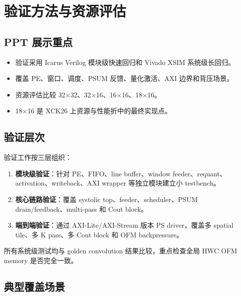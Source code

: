 \documentclass[fontset=fandol,ugly,language=chinese]{pkuthss}
\begin{document}
\chapter{验证方法与资源评估}

\section{PPT 展示重点}

\begin{itemize}
    \item 验证采用 Icarus Verilog 模块级快速回归和 Vivado XSIM 系统级长回归。
    \item 覆盖 PE、窗口、调度、PSUM 反馈、量化激活、AXI 边界和背压场景。
    \item 资源评估比较 32$\times$32、32$\times$16、16$\times$16、18$\times$16。
    \item 18$\times$16 是 XCK26 上资源与性能折中的最终实现点。
\end{itemize}

\section{验证层次}

验证工作按三层组织：

\begin{enumerate}
    \item \textbf{模块级验证}：针对 PE、FIFO、line buffer、window feeder、requant、activation、writeback、AXI wrapper 等独立模块建立小 testbench。
    \item \textbf{核心链路验证}：覆盖 systolic top、feeder、scheduler、PSUM drain/feedback、multi-pass 和 Cout block。
    \item \textbf{端到端验证}：通过 AXI-Lite/AXI-Stream 版本 PS driver，覆盖多 spatial tile、多 K pass、多 Cout block 和 OFM backpressure。
\end{enumerate}

所有系统级测试均与 golden convolution 结果比较，重点检查全局 HWC OFM memory 是否完全一致。

\section{典型覆盖场景}
\end{document}
